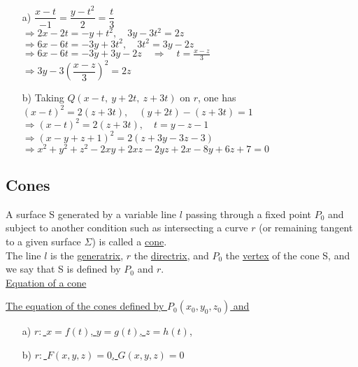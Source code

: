 \documentclass{amsbook}
\begin{document}

\begin{hSolution}
\begin{enumerate}
	\item [a)] 
		$\dfrac{x - t}{-1} = \dfrac{y - t ^ 2}{2} = \dfrac{t}{3}$ \\
		$\Rightarrow 2x - 2t = -y + t^2, \quad 3y - 3t^2 = 2z$ \\
		$\Rightarrow 6x - 6t = -3y + 3t^2, \quad 3t^2 = 3y - 2z$ \\
		$\Rightarrow 6x - 6t = -3y + 3y - 2z \quad \Rightarrow \quad t = \frac{x - z}{3}$ \\
		$\Rightarrow 3y - 3(\dfrac{x - z}{3})^2 = 2z$ \\
	\item [b)] Taking $Q(x - t, \ y + 2t, \ z + 3t)$ on $r$, one has \\
		$(x - t)^2 = 2(z + 3t), \quad (y + 2t) - (z + 3t) =  1$ \\
		$\Rightarrow (x - t)^2 = 2(z + 3t), \quad t = y - z - 1$ \\
 		$\Rightarrow (x - y + z + 1)^2 = 2(z + 3y - 3z - 3)$ \\
		$\Rightarrow x^2 + y^2 + z^2 - 2xy + 2xz - 2yz + 2x - 8y + 6z + 7 = 0$ \\
\end{enumerate}
\end{hSolution}

\subsection{Cones}
A surface S generated by a variable line $l$ passing through a fixed point $P_0$ and subject to another condition such
as intersecting a curve $r$ (or remaining tangent to a given surface $\Sigma$) is called a \underline{cone}. \\

The line $l$ is the \underline{generatrix}, $r$ the \underline{directrix}, and $P_0$ the \underline{vertex} of the cone S, and we say that S is defined by $P_0$ and $r$. \\

\underline{Equation of a cone}

\underline{The equation of the cones defined by $P_0(x_0, y_0, z_0)$ and}
\begin{enumerate}
	\item [a)] \underline{$r:$ $x = f(t)$, $y = g(t)$, $z = h(t)$},
	\item [b)] \underline{$r:$ $F(x, y , z) = 0$, $G(x, y , z) = 0$}
\end{enumerate}
\end{document}
